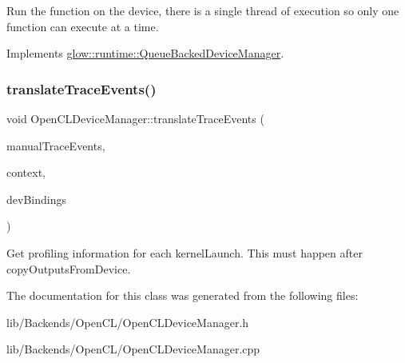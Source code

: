 Run the function on the device, there is a single thread of execution so only one function can execute at a time. 

Implements \hyperlink{classglow_1_1runtime_1_1_queue_backed_device_manager_a9ff4d91593080b083667b4270f05a850}{glow\+::runtime\+::\+Queue\+Backed\+Device\+Manager}.

\mbox{\label{classglow_1_1runtime_1_1_open_c_l_device_manager_a32a22b300fdef9738ed026af279e296a}} 
\subsubsection{\texorpdfstring{translate\+Trace\+Events()}{translateTraceEvents()}}
{\footnotesize\ttfamily void Open\+C\+L\+Device\+Manager\+::translate\+Trace\+Events (\begin{DoxyParamCaption}\item[{Manual\+Event\+Map \&}]{manual\+Trace\+Events,  }\item[{\hyperlink{classglow_1_1_execution_context}{Execution\+Context} $\ast$}]{context,  }\item[{\hyperlink{structglow_1_1runtime_1_1_open_c_l_device_bindings}{runtime\+::\+Open\+C\+L\+Device\+Bindings} $\ast$}]{dev\+Bindings }\end{DoxyParamCaption})\hspace{0.3cm}{\ttfamily [protected]}}

Get profiling information for each kernel\+Launch. This must happen after copy\+Outputs\+From\+Device. 

The documentation for this class was generated from the following files\+:\begin{DoxyCompactItemize}
\item 
lib/\+Backends/\+Open\+C\+L/Open\+C\+L\+Device\+Manager.\+h\item 
lib/\+Backends/\+Open\+C\+L/Open\+C\+L\+Device\+Manager.\+cpp\end{DoxyCompactItemize}
